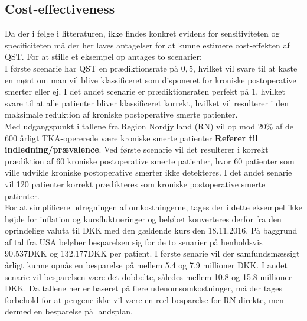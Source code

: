 \subsection{Cost-effectiveness}
Da der i følge  i litteraturen, ikke findes konkret evidens for sensitiviteten og specificiteten må der her laves antagelser for at kunne estimere cost-effekten af QST. For at stille et eksempel op antages to scenarier: \\
I første scenarie har QST en prædiktionsrate på $0,5$, hvilket vil svare til at kaste en mønt om man vil blive klassificeret som disponeret for kroniske postoperative smerter eller ej.
I det andet scenarie er prædiktionsraten perfekt på $1$, hvilket svare til at alle patienter bliver klassificeret korrekt, hvilket vil resulterer i den maksimale reduktion af kroniske postoperative smerte patienter. \\
Med udgangspunkt i tallene fra Region Nordjylland (RN) vil op mod 20\% af de 600 årligt TKA-opererede være kroniske smerte patienter \textbf{Referer til indledning/prævalence}. Ved første scenarie vil det resulterer i korrekt prædiktion af 60 kroniske postoperative smerte patienter, hvor 60 patienter som ville udvikle kroniske postoperative smerter ikke detekteres. I det andet senarie vil 120 patienter korrekt prædikteres som kroniske postoperative smerte patienter. \\
For at simplificere udregningen af omkostningerne, tages der i dette eksempel ikke højde for inflation og kursfluktueringer og beløbet konverteres derfor fra den oprindelige valuta til DKK med den gældende kurs den 18.11.2016.
På baggrund af tal fra USA beløber besparelsen sig for de to senarier på henholdsvis 90.537DKK og 132.177DKK per patient. I første senarie vil der samfundsmæssigt årligt kunne opnås en besparelse på mellem 5.4 og 7.9 millioner DKK. I andet senarie vil besparelsen være det dobbelte, således mellem 10.8 og 15.8 millioner DKK. Da tallene her er baseret på flere udenomsomkostninger, må der tages forbehold for at pengene ikke vil være en reel besparelse for RN direkte, men dermed en besparelse på landsplan.




